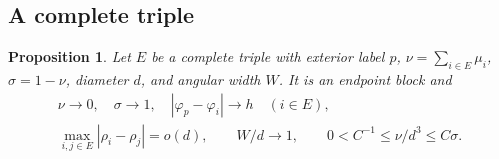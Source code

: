 \documentclass[11pt,a4paper]{article}
\numberwithin{equation}{section}
\newtheorem{proposition}[theorem]{Proposition}
\theoremstyle{remark}
\begin{document}
\subsection{A complete triple}
\begin{proposition}\label{prop:triple-scale}
Let $E$ be a complete triple with exterior label $p$, $\nu=\sum_{i\in E}\mu_i$, $\sigma=1-\nu$, diameter $d$, and angular width $W$. It is an endpoint block and
\begin{equation}\label{eq:triple-scale}
 \begin{gathered}
 \nu\to0,\quad\sigma\to1,\quad|\varphi_p-\varphi_i|\to h\quad(i\in E),\\
 \max_{i,j\in E}|\rho_i-\rho_j|=o(d),\qquad W/d\to1,\qquad
 0<C^{-1}\le\nu/d^3\le C\sigma.
 \end{gathered}
\end{equation}
\end{proposition}
\end{document}
